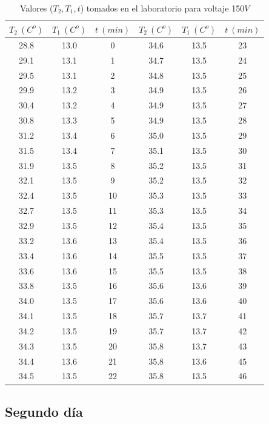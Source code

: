 \documentclass[12pt,a4paper]{article}
\begin{document}
\begin{table}[h!] 	 \centering 
\begin{tabular}{|c|c|c||c|c|c|} 
\hline 
$T_2 \ (C^o)$ & $T_1 \ (C^o) $ & $t \ (min)$ & $T_2 \ (C^o)$ & $T_1 \ (C^o) $ & $t \ (min)$ \\ \hline 
28.8 &  13.0 & 0 & 34.6 & 13.5 & 23 \\ 
29.1 &  13.1 & 1 & 34.7 & 13.5 & 24 \\ 
29.5 &  13.1 & 2 & 34.8 & 13.5 & 25 \\ 
29.9 &  13.2 & 3 & 34.9 & 13.5 & 26 \\ 
30.4 &  13.2 & 4 & 34.9 & 13.5 & 27 \\ 
30.8 &  13.3 & 5 & 34.9 & 13.5 & 28 \\ 
31.2 &  13.4 & 6 & 35.0 & 13.5 & 29 \\ 
31.5 &  13.4 & 7 & 35.1 & 13.5 & 30 \\ 
31.9 &  13.5 & 8 & 35.2 & 13.5 & 31 \\ 
32.1 &  13.5 & 9 & 35.2 & 13.5 & 32 \\ 
32.4 &  13.5 & 10 & 35.3 & 13.5 & 33 \\ 
32.7 &  13.5 & 11 & 35.3 & 13.5 & 34 \\ 
32.9 &  13.5 & 12 & 35.4 & 13.5 & 35 \\ 
33.2 &  13.6 & 13 & 35.4 & 13.5 & 36 \\ 
33.4 &  13.6 & 14 & 35.5 & 13.5 & 37 \\ 
33.6 &  13.6 & 15 & 35.5 & 13.5 & 38 \\ 
33.8 &  13.5 & 16 & 35.6 & 13.6 & 39 \\ 
34.0 &  13.5 & 17 & 35.6 & 13.6 & 40 \\ 
34.1 &  13.5 & 18 & 35.7 & 13.7 & 41 \\ 
34.2 &  13.5 & 19 & 35.7 & 13.7 & 42 \\ 
34.3 &  13.5 & 20 & 35.8 & 13.7 & 43 \\ 
34.4 &  13.6 & 21 & 35.8 & 13.6 & 45 \\ 
34.5 &  13.5 & 22 & 35.8 & 13.5 & 46 \\ 
\hline 
\end{tabular} 
\caption{Valores ($T_2,T_1,t$) tomados en el laboratorio para voltaje 150$V$}  
\label{tab:} 
\end{table} 

\newpage

\subsection{Segundo día}
\end{document}
